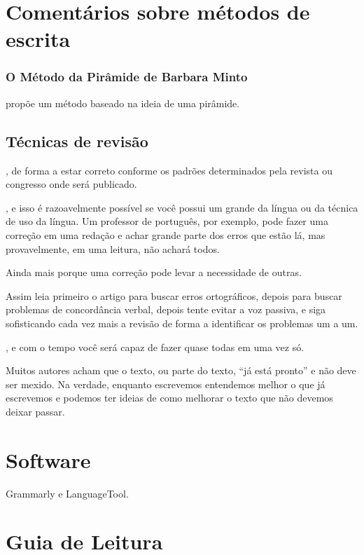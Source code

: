 \documentclass[openany]{book}
\begin{document}
\chapter{Comentários sobre métodos de escrita}

\subsection{O Método da Pirâmide de Barbara Minto}

\citet{minto2009pyramid} propõe um método baseado na ideia de uma pirâmide.


\section{Técnicas de revisão}

, de forma a estar correto conforme os padrões determinados pela revista ou congresso onde será publicado.

, e isso é razoavelmente possível se você possui um grande da língua ou da técnica de uso da língua. Um professor de português, por exemplo, pode fazer uma correção em uma redação e achar grande parte dos erros que estão lá, mas provavelmente, em uma leitura, não achará todos.

 Ainda mais porque uma correção pode levar a necessidade de outras.

 Assim leia primeiro o artigo para buscar erros ortográficos, depois para buscar problemas de concordância verbal, depois tente evitar a voz passiva, e siga sofisticando cada vez mais a revisão de forma a identificar os problemas um a um.

, e com o tempo você será capaz de fazer quase todas em uma vez só.


 Muitos autores acham que o texto, ou parte do texto, ``já está pronto'' e não deve ser mexido. Na verdade, enquanto escrevemos entendemos melhor o que já escrevemos e podemos ter ideias de como melhorar o texto que não devemos deixar passar.

\chapter{Software}
\label{sec:software}
Grammarly e LanguageTool.

\chapter{Guia de Leitura}


\backmatter

\printbibliography

\newpage

\listofsubjects
\end{document}

